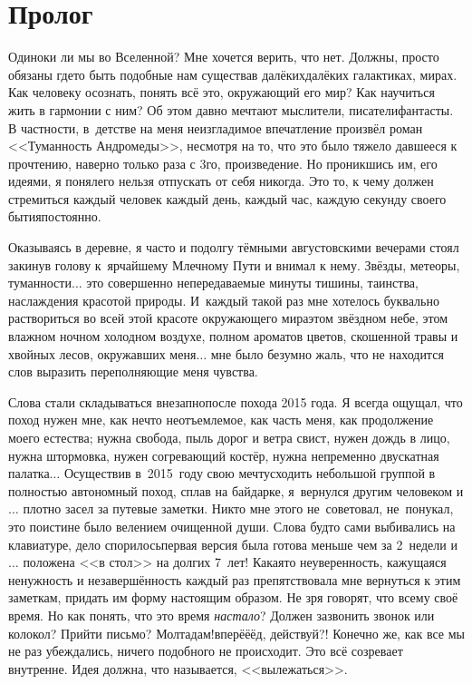 {
\cleardoublepage
{}

\fancyhead[LE]{\fancyplain{}{}}
\fancyhead[RO]{\fancyplain{}{}}

\section*{Пролог}

Одиноки ли мы во Вселенной? Мне хочется верить, что нет. Должны, просто обязаны где\sdash то быть подобные нам существа\mdash в далёких\sdash далёких галактиках, мирах. Как человеку осознать, понять всё это, окружающий его мир? Как научиться жить в гармонии с ним? Об этом давно мечтают мыслители, писатели\sdash фантасты. В частности, в~детстве на меня неизгладимое впечатление произвёл роман <<Туманность Андромеды>>\cite{ТуманностьАндромеды}, несмотря на то, что это было тяжело давшееся к прочтению, наверно только раза с 3\sdash го, произведение. Но проникшись им, его идеями, я понял\mdash его нельзя отпускать от себя ни\sdash ко\sdash гда. Это то, к чему должен стремиться каждый человек каждый день, каждый час, каждую секунду своего бытия\mdash постоянно. 

Оказываясь в деревне, я часто и подолгу тёмными августовскими вечерами стоял закинув голову к~ярчайшему Млечному Пути и внимал к нему. Звёзды, метеоры, туманности$\ldots$ это совершенно непередаваемые минуты тишины, таинства, наслаждения красотой природы. И~каждый такой раз мне хотелось буквально раствориться во всей этой красоте окружающего мира\mdash этом звёздном небе, этом влажном ночном холодном воздухе, полном ароматов цветов, скошенной травы и хвойных лесов, окружавших меня$\ldots$ мне было безумно жаль, что не находится слов выразить переполняющие меня чувства. 

Слова стали складываться внезапно\mdash после похода 2015 года. Я всегда ощущал, что поход нужен мне, как нечто неотъемлемое, как часть меня, как продолжение моего естества; нужна свобода, пыль дорог и ветра свист, нужен дождь в лицо, нужна штормовка, нужен согревающий костёр, нужна непременно двускатная палатка$\ldots$ Осуществив в~2015~году свою мечту\mdash сходить небольшой группой в полностью автономный поход, сплав на байдарке, \mdash я~вернулся другим человеком и$\ldots$ плотно засел за путевые заметки. Никто мне этого не~советовал, не~понукал, это поистине было велением очищенной души. Слова будто сами выбивались на клавиатуре, дело спорилось\mdash первая версия была готова меньше чем за 2~недели и$\ldots$ положена <<в стол>> на долгих 7~лет! Какая\sdash то неуверенность, кажущаяся ненужность и незавершённость каждый раз препятствовала мне вернуться к этим заметкам, придать им форму настоящим образом. Не зря говорят, что всему своё время. Но как понять, что это время \textit{настало}? Должен зазвонить звонок или колокол? Прийти письмо? Мол\mdash та\sdash дам!\mdash вперё\sdash ё\sdash ёд, действуй?! Конечно же, как все мы не раз убеждались, ничего подобного не происходит. Это всё созревает внутренне. Идея должна, что называется, <<вылежаться>>.

}
